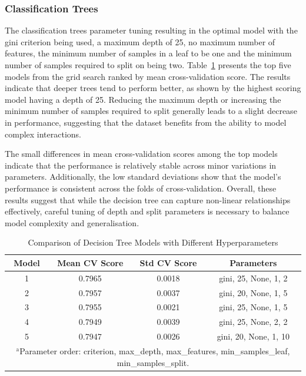 \documentclass[10pt, conference]{IEEEtran}
\begin{document}
\subsubsection{Classification Trees}
The classification trees parameter tuning resulting in the optimal model with the gini criterion being used, a maximum depth of 25, no maximum number of features, the minimum number of samples in a leaf to be one and the minimum number of samples required to split on being two. Table~\ref{tab:dt_comparison} presents the top five models from the grid search ranked by mean cross-validation score. The results indicate that deeper trees tend to perform better, as shown by the highest scoring model having a depth of 25. Reducing the maximum depth or increasing the minimum number of samples required to split generally leads to a slight decrease in performance, suggesting that the dataset benefits from the ability to model complex interactions.

The small differences in mean cross-validation scores among the top models indicate that the performance is relatively stable across minor variations in parameters. Additionally, the low standard deviations show that the model’s performance is consistent across the folds of cross-validation. Overall, these results suggest that while the decision tree can capture non-linear relationships effectively, careful tuning of depth and split parameters is necessary to balance model complexity and generalisation.



\begin{table}[htbp]
	\caption{Comparison of Decision Tree Models with Different Hyperparameters}
	\begin{center}
		\begin{tabular}{|c|c|c|c|}
			\hline
			\textbf{Model} & \textbf{Mean CV Score} & \textbf{Std CV Score} & \textbf{Parameters} \\
			\hline
			1 & 0.7965 & 0.0018 & gini, 25, None, 1, 2 \\ \hline
			2 & 0.7957 & 0.0037 & gini, 20, None, 1, 5 \\ \hline
			3 & 0.7955 & 0.0021 & gini, 25, None, 1, 5 \\ \hline
			4 & 0.7949 & 0.0039 & gini, 25, None, 2, 2 \\ \hline
			5 & 0.7947 & 0.0026 & gini, 20, None, 1, 10 \\ \hline
			\multicolumn{4}{p{0.95\linewidth}}{%
				$^{\mathrm{a}}$Parameter order: criterion, max\_depth, max\_features, min\_samples\_leaf, min\_samples\_split.%
			} 
		\end{tabular}
		\label{tab:dt_comparison}
	\end{center}
\end{table}
\end{document}

